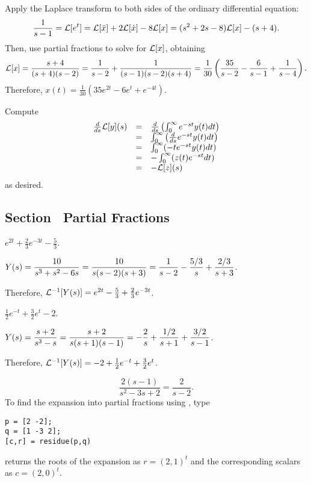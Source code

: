 \soln Apply the Laplace transform to both sides of the ordinary
differential equation:
\[
\frac{1}{s-1} = {\cal L}[e^t]
= {\cal L}[\ddot{x}] + 2{\cal L}[\dot{x}] - 8{\cal L}[x]
= (s^2 + 2s - 8){\cal L}[x] - (s + 4).
\]
Then, use partial fractions to solve for ${\cal L}[x]$, obtaining
\[
{\cal L}[x] = \frac{s+4}{(s + 4)(s - 2)}
= \frac{1}{s-2} + \frac{1}{(s-1)(s-2)(s+4)}
= \frac{1}{30}\left(\frac{35}{s-2} - \frac{6}{s-1} + \frac{1}{s-4}\right).
\]
Therefore, $x(t)=\frac{1}{30}(35e^{2t}-6e^t+e^{-4t})$.


 Compute
\[
\begin{array}{rcl}
\frac{d}{ds}{\cal L}[y](s)
& = & \frac{d}{ds}\left(\int_0^\infty e^{-st}y(t)dt\right) \\
& = & \int_0^\infty\left(\frac{d}{ds} e^{-st}y(t)dt\right) \\
& = & \int_0^\infty (-te^{-st}y(t)dt) \\
& = & -\int_0^\infty (z(t)e^{-st}dt) \\
& = & -{\cal L}[z](s)
\end{array}
\]
as desired.



\newpage
\subsection*{Section~\protect{\ref{S:PF}} Partial Fractions}

 \ans $e^{2t}+\frac{2}{3}e^{-3t}-\frac{5}{3}$.

\soln $Y(s)=\displaystyle\frac{10}{s^3+s^2-6s} = \frac{10}{s(s-2)(s+3)}=
\frac{1}{s-2}-\frac{5/3}{s}+\frac{2/3}{s+3}$.  

Therefore,
${\cal L}^{-1}[Y(s)] = e^{2t}-\frac{5}{3}+\frac{2}{3}e^{-3t}$.


 \ans $\frac{1}{2}e^{-t} + \frac{3}{2}e^t -2$.

\soln $Y(s) = \displaystyle\frac{s+2}{s^3-s} = \frac{s+2}{s(s+1)(s-1)} =
-\frac{2}{s} + \frac{1/2}{s+1} + \frac{3/2}{s-1}$.

Therefore, ${\cal L}^{-1}[Y(s)] = -2 + \frac{1}{2}e^{-t} + \frac{3}{2}e^t$.


 \ans
\[
\frac{2(s - 1)}{s^2 - 3s + 2} = \frac{2}{s - 2}.
\]
\soln To find the expansion into partial fractions using \Matlabp, type
\begin{verbatim}
p = [2 -2];
q = [1 -3 2];
[c,r] = residue(p,q)
\end{verbatim}
\Matlab returns the roots of the expansion as $r = (2,1)^t$ and
the corresponding scalars as $c = (2,0)^t$.

